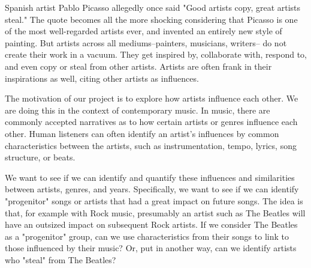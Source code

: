 Spanish artist Pablo Picasso allegedly once said "Good artists copy, great artists steal."
The quote becomes all the more shocking considering that Picasso is one of the most
well-regarded artists ever, and invented an entirely new style of painting.
But artists across all mediums--painters, musicians, writers--
do not create their work in a vacuum.
They get inspired by, collaborate with, respond to, and even copy or steal from other artists.
Artists are often frank in their inspirations as well, citing other artists as influences.

The motivation of our project is to explore how artists influence each other.
We are doing this in the context of contemporary music.
In music, there are commonly accepted narratives as to how certain artists or genres
influence each other.
Human listeners can often identify an artist's influences by common
characteristics between the artists, such as instrumentation, tempo, lyrics, song structure,
or beats.

We want to see if we can identify and quantify these influences and similarities
between artists, genres, and years.
Specifically, we want to see if we can identify "progenitor" songs or artists
that had a great impact on future songs.
The idea is that, for example with Rock music, presumably an artist such as The Beatles
will have an outsized impact on subsequent Rock artists.
If we consider The Beatles as a "progenitor" group,
can we use characteristics from their songs to link to those influenced by their music?
Or, put in another way, can we identify artists who "steal" from The Beatles?
